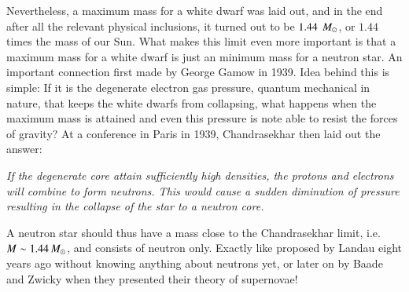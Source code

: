 

Nevertheless, a maximum mass for a white dwarf was laid out, and in the end after all the relevant physical inclusions, it turned out to be $1.44~\, M_{\odot}$, or $1.44$ times the mass of our Sun.
What makes this limit even more important is that a maximum mass for a white dwarf is just an minimum mass for a neutron star.
An important connection first made by George Gamow in 1939\cite{Gamow39}.
Idea behind this is simple: 
If it is the degenerate electron gas pressure, quantum mechanical in nature, that keeps the white dwarfs from collapsing, what happens when the maximum mass is attained and even this pressure is note able to resist the forces of gravity?
At a conference in Paris in 1939, Chandrasekhar then laid out the answer:
\begin{displayquote}
    \textit{
    If the degenerate core attain sufficiently high densities, the protons and electrons will combine to form neutrons. 
    This would cause a sudden diminution of pressure resulting in the collapse of the star to a neutron core.
    }
\end{displayquote}
A neutron star should thus have a mass close to the Chandrasekhar limit, i.e. $M \sim 1.44\, M_{\odot}$, and consists of neutron only.
Exactly like proposed by Landau eight years ago without knowing anything about neutrons yet, or later on by Baade and Zwicky when they presented their theory of supernovae!




